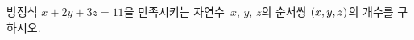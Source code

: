 방정식 $x+2y+3z=11$을 만족시키는 자연수~$x$, $y$, $z$의 순서쌍 $(x{,}\mkern3mu\mathopen{}y{,}\mkern3mu\mathopen{}z)$의 개수를 구하시오.
